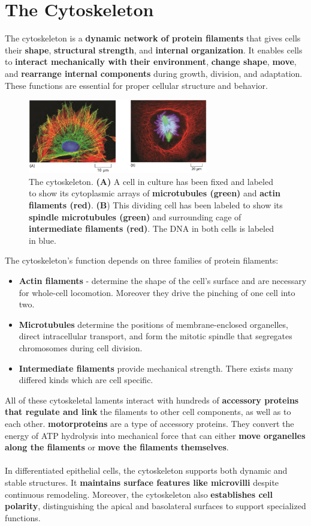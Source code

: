 \documentclass[../main.tex]{subfiles}
\begin{document}
\section{The Cytoskeleton}
The cytoskeleton is a \textbf{dynamic network of protein filaments} that gives cells their \textbf{shape}, \textbf{structural strength}, and \textbf{internal organization}. It enables cells to \textbf{interact mechanically with their environment}, \textbf{change shape}, \textbf{move}, and \textbf{rearrange internal components} during growth, division, and adaptation. These functions are essential for proper cellular structure and behavior.
\begin{figure}[H]
	\centering
	\includegraphics[width = 0.7\textwidth]{1}
	\caption{The cytoskeleton. \textbf{(A)} A cell in culture has been fixed and labeled to show its cytoplasmic arrays of \textbf{microtubules (green)} and \textbf{actin filaments (red)}. \textbf{(B}) This dividing cell has been labeled to show its \textbf{spindle microtubules (green)} and surrounding cage of \textbf{intermediate filaments (red)}. The DNA in both cells is labeled in blue.}
\end{figure}
The cytoskeleton's function depends on three families of protein filaments: 
\begin{itemize}
	\item \textbf{Actin filaments} - determine the shape of the cell’s surface and are necessary for whole-cell locomotion. Moreover they drive the pinching of one cell into two. 
	
	\item \textbf{Microtubules} determine the positions of membrane-enclosed organelles, direct intracellular transport, and form the mitotic spindle that segregates chromosomes during cell division.
	
	\item \textbf{Intermediate filaments} provide mechanical strength. There exists many differed kinds which are cell specific. 
\end{itemize}
All of these cytoskeletal laments interact with hundreds of \textbf{accessory proteins that regulate and link} the filaments to other cell components, as well as to each other. \textbf{\gls{motorproteins}} are a type of accessory proteins. They convert the energy of ATP hydrolysis into mechanical force that can either \textbf{move organelles along the filaments} or \textbf{move the filaments themselves}.\\
\\
In differentiated epithelial cells, the cytoskeleton supports both dynamic and stable structures. It \textbf{maintains surface features like \gls{microvilli}} despite continuous remodeling. Moreover, the cytoskeleton also \textbf{establishes cell polarity}, distinguishing the apical and basolateral surfaces to support specialized functions.
\end{document}
